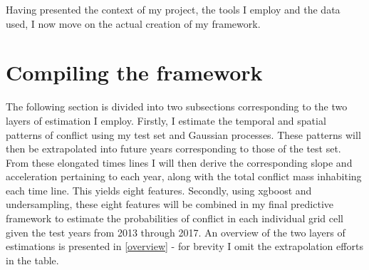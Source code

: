 \documentclass[a4paper]{article}
\begin{document}

Having presented the context of my project, the tools I employ and the data used, I now move on the actual creation of my framework.\par


\section{Compiling the framework}%

The following section is divided into two subsections corresponding to the two layers of estimation I employ. Firstly, I estimate the temporal and spatial patterns of conflict using my test set and Gaussian processes. These patterns will then be extrapolated into future years corresponding to those of the test set. From these elongated times lines I will then derive the corresponding slope and acceleration pertaining to each year, along with the total conflict mass inhabiting each time line. This yields eight features. Secondly, using xgboost and undersampling, these eight features will be combined in my final predictive framework to estimate the probabilities of conflict in each individual grid cell given the test years from 2013 through 2017. An overview of the two layers of estimations is presented in \autoref{overview} - for brevity I omit the extrapolation efforts in the table.\par
\end{document}
